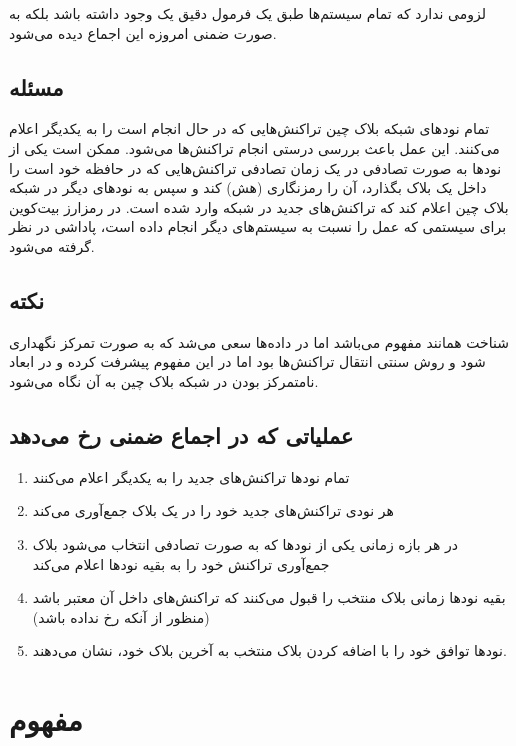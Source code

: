 \documentclass[10pt, a4paper]{article}
\begin{document}
لزومی ندارد که تمام سیستم‌ها طبق یک فرمول دقیق یک  وجود داشته باشد
بلکه به صورت ضمنی امروزه این اجماع دیده می‌شود.

\subsection{مسئله }

تمام نود‌های شبکه بلاک چین تراکنش‌هایی که در حال انجام است را به یکدیگر اعلام
می‌کنند. این عمل باعث بررسی درستی انجام تراکنش‌ها می‌شود. ممکن است یکی از نود‌ها
به صورت تصادفی در یک زمان تصادفی تراکنش‌هایی که در حافظه خود است را داخل یک بلاک
بگذارد، آن را رمزنگاری (هش) کند و سپس به نود‌های دیگر در شبکه بلاک چین اعلام کند
که تراکنش‌های جدید در شبکه وارد شده است. در رمزارز بیت‌کوین برای سیستمی که عمل
 را نسبت به سیستم‌های دیگر انجام داده است، پاداشی در نظر گرفته
می‌شود.

\subsection*{نکته}

شناخت  همانند مفهوم  می‌باشد اما در  داده‌ها
سعی می‌شد که به صورت تمرکز نگهداری شود و روش سنتی انتقال تراکنش‌ها بود اما در
 این مفهوم پیشرفت کرده و در ابعاد نامتمرکز بودن در شبکه بلاک چین به
آن نگاه می‌شود.

\subsection*{عملیاتی که در اجماع ضمنی رخ می‌دهد}

\begin{enumerate}
    \item تمام نود‌ها تراکنش‌های جدید را به یکدیگر اعلام می‌کنند
    \item هر نودی تراکنش‌های جدید خود را در یک بلاک جمع‌آوری می‌کند
    \item در هر بازه زمانی یکی از نود‌ها که به صورت تصادفی انتخاب می‌شود بلاک
    جمع‌آوری تراکنش خود را به بقیه نود‌ها اعلام می‌کند
    \item بقیه نود‌ها زمانی بلاک منتخب را قبول می‌کنند که تراکنش‌های داخل آن
    معتبر باشد (منظور از آنکه  رخ نداده باشد)
    \item نود‌ها توافق خود را با اضافه کردن بلاک منتخب به آخرین بلاک خود، نشان
    می‌دهند.
\end{enumerate}

\section{مفهوم }
\end{document}
